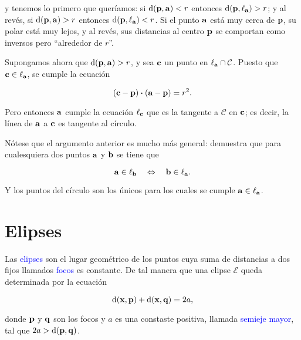 \documentclass{article}
\theoremstyle{definicion}
\theoremstyle{definition}             %
\theoremstyle{definition}             %
\theoremstyle{definition}
\theoremstyle{definition}
\theoremstyle{observacion}
\theoremstyle{definition}
\theoremstyle{plain}
\theoremstyle{definition}
\theoremstyle{afirmacion}
\theoremstyle{notation}
\theoremstyle{definition}
\begin{document}
    y tenemos lo primero que queríamos: si \(\textrm{d}(\vb{p}, \vb{a}) < r\) entonces \(\textrm{d}(\vb{p}, \ell_{\vb{a}}) > r\); y al revés, si \(\textrm{d}(\vb{p}, \vb{a}) > r\) entonces \(\textrm{d}(\vb{p}, \ell_{\vb{a}}) < r\). Si el punto \(\vb{a}\) está muy cerca de \(\vb{p}\), su polar está muy lejos, y al revés, sus distancias al centro \(\vb{p}\) se comportan como inversos pero ``alrededor de \(r\)''.

    Supongamos ahora que \(\textrm{d}(\vb{p}, \vb{a}) > r\), y sea \(\vb{c}\) un punto en \(\ell_{\vb{a}} \cap \mathcal{C}\). Puesto que \(\vb{c} \in \ell_{\vb{a}}\), se cumple la ecuación 

    \begin{equation*}
        (\vb{c} - \vb{p}) \vdot (\vb{a} - \vb{p}) = r^{2}.
    \end{equation*}

    Pero entonces \(\vb{a}\) cumple la ecuación \(\ell_{\vb{c}}\) que es la tangente a \(\mathcal{C}\) en \(\vb{c}\); es decir, la línea de \(\vb{a}\) a \(\vb{c}\) es tangente al círculo.

    Nótese que el argumento anterior es mucho más general: demuestra que para cualesquiera dos puntos \(\vb{a}\) y \(\vb{b}\) se tiene que 

    \begin{equation*}
        \vb{a} \in \ell_{\vb{b}}\quad \Leftrightarrow\quad \vb{b} \in \ell_{\vb{a}}.
    \end{equation*}

    Y los puntos del círculo son los únicos para los cuales se cumple \(\vb{a} \in \ell_{\vb{a}}\).

    \section{Elipses}

    Las \textcolor{blue}{elipses} son el lugar geométrico de los puntos cuya suma de distancias a dos fijos llamados \textcolor{blue}{focos}  es constante. De tal manera que una elipse \(\mathcal{E}\) queda determinada por la ecuación 

    \begin{equation*}
        \textrm{d}(\vb{x}, \vb{p}) + \textrm{d}(\vb{x}, \vb{q}) = 2a,
    \end{equation*}

    donde \(\vb{p}\) y \(\vb{q}\) son los focos y \(a\) es una constaste positiva, llamada \textcolor{blue}{semieje mayor}, tal que \(2a > \textrm{d}(\vb{p}, \vb{q})\).
\end{document}
